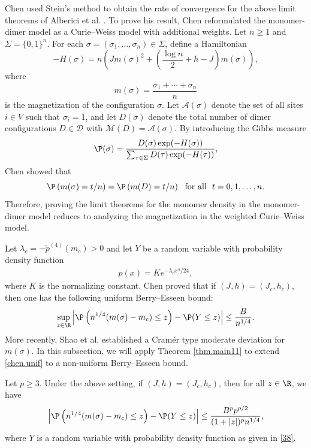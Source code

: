 	Chen \cite{chen2016limit} used Stein's method to
	obtain the rate of convergence for the above limit theorems of
	Alberici et al. \cite{alberici2014mean}. To prove his result, Chen \cite{chen2016limit}
	reformulated the monomer-dimer model as a Curie--Weiss model with additional weights.
	Let $n\ge 1$ and $\Sigma=\{0,1\}^n$. For each $\sigma=\left(\sigma_1, \ldots, \sigma_n\right) \in \Sigma$, define a Hamiltonian
	\[-H(\sigma)=n\left(J m(\sigma)^2+\left(\frac{\log n}{2}+h-J\right) m(\sigma)\right),\]
	where 
	\[m(\sigma)=\frac{\sigma_1+\cdots+\sigma_n}{n}\] 
	is the magnetization of the configuration $\sigma$. Let $\mathcal{A}(\sigma)$ denote the set of all sites $i \in V$ such that $\sigma_i=1$, and let $D(\sigma)$ denote the total number of dimer configurations $D \in \mathcal{D}$ with $\mathcal{M}(D)=\mathcal{A}(\sigma)$. By introducing the Gibbs measure
	\[\P(\sigma)=\frac{D(\sigma) \exp (-H(\sigma))}{\sum_{\tau \in \Sigma} D(\tau) \exp (-H(\tau))},\]
	Chen \cite{chen2016limit} showed that
	\[\P\left(m(\sigma)=t/n\right)=\P\left(m(D)=t/n\right)\ \text{ for all }\ t=0,1,\ldots, n.\]
	Therefore, proving the limit theorems for the monomer density in the monomer-dimer model reduces to analyzing the magnetization in the weighted Curie--Weiss model.
	
	Let $\lambda_c=-{\tilde{p}}^{(4)}\left(m_c\right)>0$ and let $Y$ be a random variable with probability density function
	\begin{align}\label{38}
		p(x)=K e^{-\lambda_c x^4 / 24},
	\end{align}
	where $K$ is the normalizing constant. Chen \cite{chen2016limit} proved that if
	$(J, h)=\left(J_c, h_c\right)$, then one has the following uniform Berry--Esseen bound:
	\begin{equation}\label{chen.unif}
		\sup_{z\in\R}\left|\P\left(n^{1/4}(m(\sigma)-m_c)\le z\right)-\P(Y\le z)\right|\le \frac{B}{n^{1/4}}.
	\end{equation}
	More recently, Shao et al. \cite{shao2021cramer} established a Cram\'{e}r type moderate deviation for $m(\sigma)$. 
	In this subsection, we will apply Theorem \ref{thm.main11} to extend \eqref{chen.unif} to a non-uniform Berry--Esseen bound.
	
	\begin{theorem}\label{thm.app2}
		Let $p\ge 3$. Under the above setting, if $(J, h)=\left(J_c, h_c\right)$, then for all $z\in\R$, we have
		\begin{equation}\label{ap4}
			\left|\P\left(n^{1/4}(m(\sigma)-m_c)\le z\right)-\P(Y\le z)\right| \le \dfrac{B^{p}p^{p/2}}{(1+|z|)^{p} n^{1/4}},
		\end{equation}
		where $Y$ is a random variable with probability density function as given in \eqref{38}.
	\end{theorem}
	
